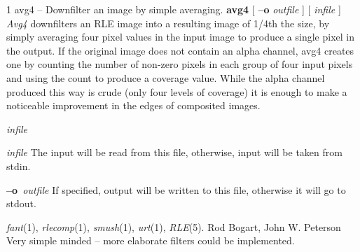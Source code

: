 %
%
%
 1
avg4 -- Downfilter an image by simple averaging.
{\bf avg4}
[
{\bf --o}
{\it outfile}
] [ 
{\it infile}
] 
{\it Avg4}
downfilters an RLE image into a resulting image of 1/4th the size,
by simply averaging four pixel values in the input image to produce a single
pixel in the output.  If the original image does not contain an alpha
channel, avg4 creates one by counting the number of non-zero pixels in each
group of four input pixels and using the count to produce a coverage value. 
While the alpha channel produced this way is crude (only four levels of
coverage) it is enough to make a noticeable improvement in the edges of 
composited images.  
\begin{TPlist}{{\it infile}}
\item[{{\it infile}}]
The input will be read from this file, otherwise, input will
be taken from stdin.
\item[{{\bf --o}{\it \ outfile}
}]
If specified, output will be written to this file, otherwise it will
go to stdout.
\end{TPlist}
{\it fant}{\rm (1),}
{\it rlecomp}{\rm (1),}
{\it smush}{\rm (1),}
{\it urt}{\rm (1),}
{\it RLE}{\rm (5).}
Rod Bogart, John W. Peterson
Very simple minded -- more elaborate filters could be implemented.

\newpage


